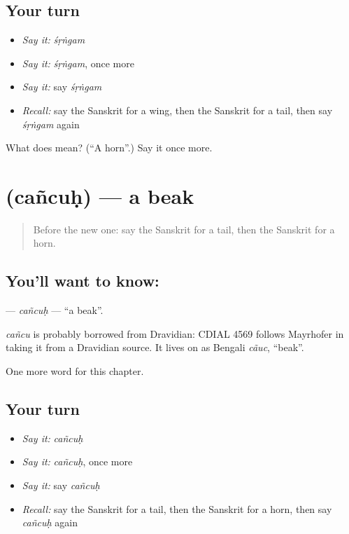 \subsection*{Your turn}
\begin{itemize}
\raggedright
  \item \emph{Say it:} \emph{śṛṅgam}
  \item \emph{Say it:} \emph{śṛṅgam}, once more
  \item \emph{Say it:} say \emph{śṛṅgam}
  \item \emph{Recall:} say the Sanskrit for a wing, then the Sanskrit for a tail, then say \emph{śṛṅgam} again
\end{itemize}

\begin{tcolorbox}[breakable,colback=teal!4,colframe=teal!35!black,title={Before you move on}]
What does  mean? (\textquotedblleft{}A horn\textquotedblright{}.) Say it once more.
\end{tcolorbox}
\section[\texorpdfstring{\sk{चञ्चुः} (cañcuḥ)}{चञ्चुः (cañcuḥ)}]{ (cañcuḥ) — a beak}

\label{lesson:SA-C227-cancuh}



\begin{quote}
Before the new one: say the Sanskrit for a tail, then the Sanskrit for a horn.
\end{quote}

\subsection*{You'll want to know: }
\textbf{} — \emph{cañcuḥ} — \textquotedblleft{}a beak\textquotedblright{}.

\begin{cousinweb}
\emph{cañcu} is probably borrowed from Dravidian: CDIAL 4569 follows Mayrhofer in taking it from a Dravidian source. It lives on as Bengali \emph{cãuc}, \textquotedblleft{}beak\textquotedblright{}.
\end{cousinweb}

\begin{grammarlens}[title={What you've built}]
One more word for this chapter.
\end{grammarlens}

\subsection*{Your turn}
\begin{itemize}
\raggedright
  \item \emph{Say it:} \emph{cañcuḥ}
  \item \emph{Say it:} \emph{cañcuḥ}, once more
  \item \emph{Say it:} say \emph{cañcuḥ}
  \item \emph{Recall:} say the Sanskrit for a tail, then the Sanskrit for a horn, then say \emph{cañcuḥ} again
\end{itemize}

